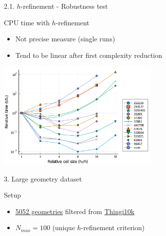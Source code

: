 \documentclass{beamer}
\begin{document}
\begin{frame}{2.1. $h$-refinement - Robustness test}

  \begin{block}{CPU time with $h$-refinement}
  \begin{itemize}
    \item
      Not precise measure (single runs)
    \item
      Tend to be linear after first complexity reduction
  \end{itemize}
  \end{block}

  \centering
  \includegraphics[width=0.60\textwidth]{../analysis/plots/x_nmax_y_time}

\end{frame}


\begin{frame}{3. Large geometry dataset}
  \begin{block}{Setup}
    \begin{itemize}
      \item
  
        \href{https://ten-thousand-models.appspot.com/results.html?q=is+closed\%2C+is+oriented\%2C+is+manifold\%2C+is+not+degenerate\%2C+without+self-intersection\%2C+\%23df\%3D0}{\underline{5052 geometries}}
        filtered from \href{https://ten-thousand-models.appspot.com}{Thingi10k}

        
      \item
        $N_{max} = 100 $ (unique $h$-refinement criterion)
    \end{itemize}

  \end{block}

\end{frame}
\end{document}
